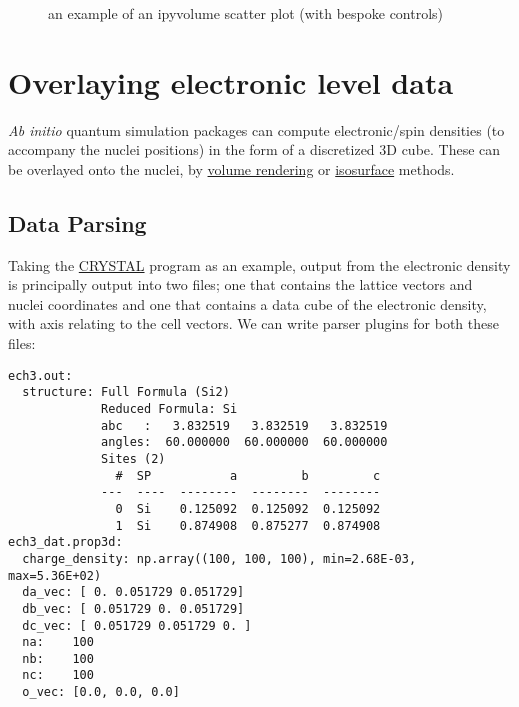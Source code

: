 \documentclass[10pt,parskip=half,
	toc=sectionentrywithdots,
	bibliography=totocnumbered,
	captions=tableheading,numbers=noendperiod]{scrartcl}
\begin{document}
\begin{figure}[H]\begin{center}\end{center}\caption{an example of an ipyvolume scatter plot (with bespoke controls)}\label{fig:ipyvol2}
    \end{figure}

\section{Overlaying electronic level
data}\label{overlaying-electronic-level-data}

\emph{Ab initio} quantum simulation packages can compute electronic/spin
densities (to accompany the nuclei positions) in the form of a
discretized 3D cube. These can be overlayed onto the nuclei, by
\href{https://en.wikipedia.org/wiki/Volume_rendering}{volume rendering}
or \href{https://en.wikipedia.org/wiki/Isosurface}{isosurface} methods.

\subsection{Data Parsing}\label{data-parsing}

Taking the \href{http://www.crystal.unito.it/index.php}{CRYSTAL} program
as an example, output from the electronic density is principally output
into two files; one that contains the lattice vectors and nuclei
coordinates and one that contains a data cube of the electronic density,
with axis relating to the cell vectors. We can write parser plugins for
both these files:

\begin{lstlisting}[language={},postbreak={},numbers=none,xrightmargin=7pt,belowskip=5pt,aboveskip=5pt,breakindent=0pt]
ech3.out: 
  structure: Full Formula (Si2)
             Reduced Formula: Si
             abc   :   3.832519   3.832519   3.832519
             angles:  60.000000  60.000000  60.000000
             Sites (2)
               #  SP           a         b         c
             ---  ----  --------  --------  --------
               0  Si    0.125092  0.125092  0.125092
               1  Si    0.874908  0.875277  0.874908
ech3_dat.prop3d: 
  charge_density: np.array((100, 100, 100), min=2.68E-03, max=5.36E+02)
  da_vec: [ 0. 0.051729 0.051729]
  db_vec: [ 0.051729 0. 0.051729]
  dc_vec: [ 0.051729 0.051729 0. ]
  na:    100
  nb:    100
  nc:    100
  o_vec: [0.0, 0.0, 0.0]

\end{lstlisting}
\end{document}
